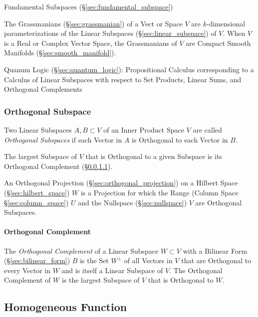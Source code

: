 \fist Fundamental Subspaces (\S\ref{sec:fundamental_subspace})

The Grassmanians (\S\ref{sec:grassmanian}) of a Vect or Space $V$ are
$k$-dimensional parameterizations of the Linear Subspaces
(\S\ref{sec:linear_subspace}) of $V$. When $V$ is a Real or Complex Vector
Space, the Grassmanians of $V$ are Compact Smooth Manifolds
(\S\ref{sec:smooth_manifold}).

\fist Quanum Logic (\S\ref{sec:quantum_logic}): Propositional Calculus
corresponding to a Calculus of Linear Subspaces with respect to Set Products,
Linear Sums, and Orthogonal Complements



\subsubsection{Orthogonal Subspace}\label{sec:orthogonal_subspace}

Two Linear Subspaces $A, B \subset V$ of an Inner Product Space $V$ are called
\emph{Orthogonal Subspaces} if each Vector in $A$ is Orthogonal to each Vector
in $B$.

The largest Subspace of $V$ that is Orthogonal to a given Subspace is its
Orthogonal Complement (\S\ref{sec:orthogonal_complement}).

An Orthogonal Projection (\S\ref{sec:orthogonal_projection}) on a Hilbert Space
(\S\ref{sec:hilbert_space}) $W$ is a Projection for which the Range (Column
Space \S\ref{sec:column_space}) $U$ and the Nullspace (\S\ref{sec:nullspace})
$V$ are Orthogonal Subspaces.



\paragraph{Orthogonal Complement}\label{sec:orthogonal_complement}\hfill

The \emph{Orthogonal Complement} of a Linear Subspace $W \subset V$ with a
Bilinear Form (\S\ref{sec:bilinear_form}) $B$ is the Set $W^\bot$ of all
Vectors in $V$ that are Orthogonal to every Vector in $W$ and is itself a
Linear Subspace of $V$. The Orthogonal Complement of $W$ is the largest
Subspace of $V$ that is Orthogonal to $W$.



\subsection{Homogeneous Function}\label{sec:homogeneous_function}


